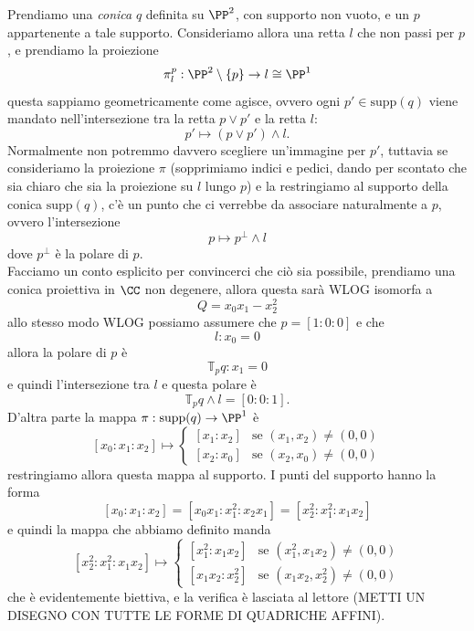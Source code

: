 \documentclass[11pt]{scrartcl}
\begin{document}
	Prendiamo una \textit{conica} $q$ definita su $\PP^2$, con supporto non vuoto, e un $p$ appartenente a tale supporto. Consideriamo allora una retta $l$ che non passi per $p$, e prendiamo la proiezione
	$$\pi_{l}^p:\PP^2\setminus\left\{p\right\}\to l\cong \PP^1$$
	questa sappiamo geometricamente come agisce, ovvero ogni $p'\in \text{supp}(q)$ viene mandato nell'intersezione tra la retta $p\lor p'$ e la retta $l$:
	$$p'\mapsto \left(p\lor p'\right)\land l.$$
	Normalmente non potremmo davvero scegliere un'immagine per $p'$, tuttavia se consideriamo la proiezione $\pi$ (sopprimiamo indici e pedici, dando per scontato che sia chiaro che sia la proiezione su $l$ lungo $p$) e la restringiamo al supporto della conica $\text{supp}(q)$, c'è un punto che ci verrebbe da associare naturalmente a $p$, ovvero l'intersezione 
	$$p \mapsto p^\perp \land l$$
	dove $p^\perp$ è la polare di $p$. \\
	Facciamo un conto esplicito per convincerci che ciò sia possibile, prendiamo una conica proiettiva in $\CC$ non degenere, allora questa sarà WLOG isomorfa a  
	$$Q=x_0x_1-x_2^2$$
	allo stesso modo WLOG possiamo assumere che $p=[1:0:0]$ e che 
	$$l:x_0=0$$
	allora la polare di $p$ è
	$$\mathbb{T}_pq:x_1=0$$
	e quindi l'intersezione tra $l$ e questa polare è 
	$$\mathbb{T}_pq\land l= [0:0:1].$$
	D'altra parte la mappa $\pi:\text{supp}(q)\to \PP^1$ è
	$$[x_0:x_1:x_2]\mapsto
	\begin{cases}
		[x_1:x_2] & \text{se $\left(x_1,x_2\right)\ne (0,0)$} \\
		[x_2:x_0] & \text{se $\left(x_2,x_0\right)\ne (0,0)$}
	\end{cases}
	$$
	restringiamo allora questa mappa al supporto. I punti del supporto hanno la forma
	$$[x_0:x_1:x_2]=[x_0x_1:x_1^2:x_2x_1]=[x_2^2:x_1^2:x_1x_2]$$
	e quindi la mappa che abbiamo definito manda
	$$[x_2^2:x_1^2:x_1x_2]\mapsto
	\begin{cases}
		[x_1^2:x_1x_2] & \text{se $\left(x_1^2,x_1x_2\right)\ne (0,0)$} \\
		[x_1x_2:x_2^2] & \text{se $\left(x_1x_2,x_2^2\right)\ne (0,0)$}
	\end{cases}
	$$ 
	che è evidentemente biettiva, e la verifica è lasciata al lettore (METTI UN DISEGNO CON TUTTE LE FORME DI QUADRICHE AFFINI).
\end{document}
